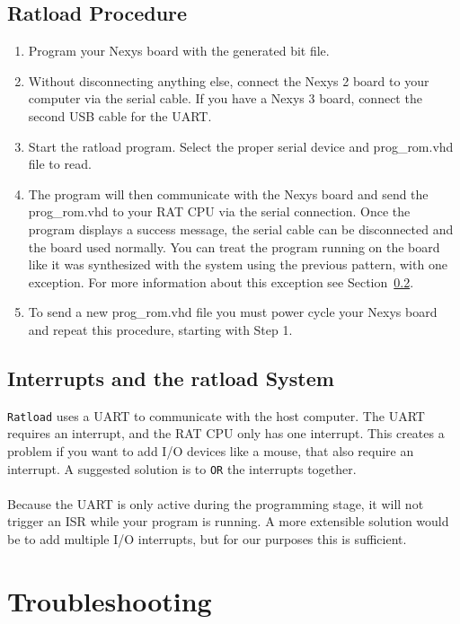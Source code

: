 \documentclass[notitlepage]{article}
\begin{document}
\subsection{Ratload Procedure}
\begin{enumerate}
\item Program your Nexys board with the generated bit file.

\item Without disconnecting anything else, connect the Nexys 2 board to your computer via the serial cable. If you have a Nexys 3 board, connect the second USB cable for the UART.

\item Start the ratload program. Select the proper serial device and prog\_rom.vhd file to read.

\item The program will then communicate with the Nexys board and send the prog\_rom.vhd to your RAT CPU via the serial connection. Once the program displays a success message, the serial cable can be disconnected and the board used normally. You can treat the program running on the board like it was synthesized with the system using the previous pattern, with one exception. For more information about this exception see Section~\ref{sec:interrupts}.

\item To send a new prog\_rom.vhd file you must power cycle your Nexys board and repeat this procedure, starting with Step 1.
\end{enumerate}

\subsection{Interrupts and the ratload System}
\label{sec:interrupts}
\texttt{Ratload} uses a UART to communicate with the host computer. The UART requires an interrupt, and the RAT CPU only has one interrupt. This creates a problem if you want to add I/O devices like a mouse, that also require an interrupt. A suggested solution is to \texttt{OR} the interrupts together.\\\\
Because the UART is only active during the programming stage, it will not trigger an ISR while your program is running. A more extensible solution would be to add multiple I/O interrupts, but for our purposes this is sufficient.

\section{Troubleshooting}
\label{sec:troubleshooting}
\end{document}
